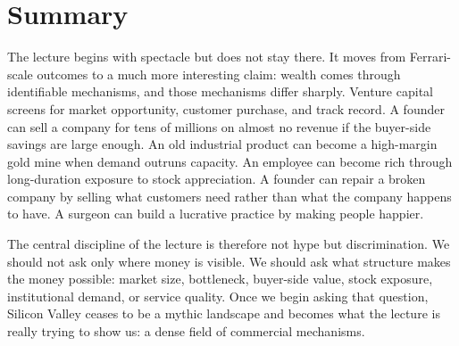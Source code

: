 \section{Summary}

The lecture begins with spectacle but does not stay there. It moves from Ferrari-scale outcomes to a much more interesting claim: wealth comes through identifiable mechanisms, and those mechanisms differ sharply. Venture capital screens for market opportunity, customer purchase, and track record. A founder can sell a company for tens of millions on almost no revenue if the buyer-side savings are large enough. An old industrial product can become a high-margin gold mine when demand outruns capacity. An employee can become rich through long-duration exposure to stock appreciation. A founder can repair a broken company by selling what customers need rather than what the company happens to have. A surgeon can build a lucrative practice by making people happier.

The central discipline of the lecture is therefore not hype but discrimination. We should not ask only where money is visible. We should ask what structure makes the money possible: market size, bottleneck, buyer-side value, stock exposure, institutional demand, or service quality. Once we begin asking that question, Silicon Valley ceases to be a mythic landscape and becomes what the lecture is really trying to show us: a dense field of commercial mechanisms.